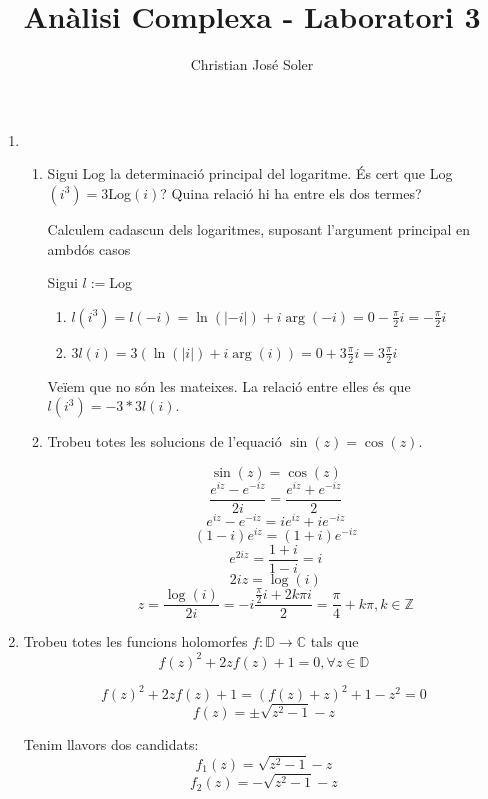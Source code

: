 \documentclass[10pt,a4paper]{article}
\author{Christian José Soler}
\title{Anàlisi Complexa - Laboratori 3}
\begin{document}
\maketitle

\begin{enumerate}
\item
	\begin{enumerate}
	\item Sigui Log la determinació principal del logaritme. És cert que Log$(i^{3})=3$Log$(i)$? Quina relació hi ha entre els dos termes?
	\begin{framed}
	Calculem cadascun dels logaritmes, suposant l'argument principal en ambdós casos
	
	Sigui $l:=$Log
	
	\begin{enumerate}
	 \item $l(i^{3}) = l(-i) = \ln(|-i|) + i\arg(-i) = 0-\frac{\pi}{2}i = -\frac{\pi}{2}i$
	 \item $3l(i) = 3(\ln(|i|)+i\arg(i)) = 0+3\frac{\pi}{2}i = 3\frac{\pi}{2}i$
	\end{enumerate}

	Veïem que no són les mateixes.	
	La relació entre elles és que $l(i^{3}) = -3*3l(i)$.
	
	\end{framed}
	\item Trobeu totes les solucions de l’equació $\sin(z)=\cos(z)$.

	\begin{framed}
	$$\sin(z) = \cos(z)$$
	$$\frac{e^{iz}-e^{-iz}}{2i} = \frac{e^{iz}+e^{-iz}}{2}$$
	$$e^{iz}-e^{-iz} = ie^{iz}+ie^{-iz}$$
	$$(1-i)e^{iz} = (1+i)e^{-iz}$$
	$$e^{2iz} = \frac{1+i}{1-i} = i$$
	$$2iz = \log(i)$$
	$$z = \frac{\log(i)}{2i} = -i\frac{\frac{\pi}{2}i+2k\pi i}{2} = \frac{\pi}{4} + k\pi, k\in\mathbb{Z}$$
	
	\end{framed}
		
	\end{enumerate}
\newpage
\item Trobeu totes les funcions holomorfes $f:\mathbb{D}\rightarrow \mathbb{C}$ tals que
	$$f(z)^{2}+2zf(z)+1=0,\forall z\in\mathbb{D}$$

	\begin{framed}	
	$$f(z)^{2}+2zf(z)+1=(f(z)+z)^{2}+1-z^{2}=0$$
	$$f(z)=\pm\sqrt{z^{2}-1}-z$$
	
	Tenim llavors dos candidats:
	$$f_{1}(z) = \sqrt{z^{2}-1}-z$$
	$$f_{2}(z) = -\sqrt{z^{2}-1}-z$$
	

\end{framed}
\end{enumerate}
\end{document}
